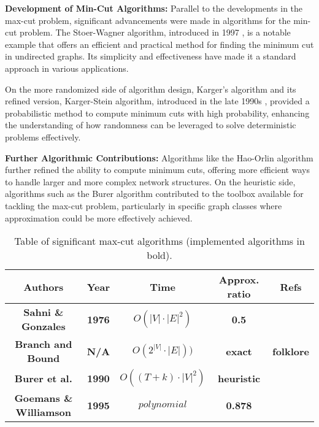 \textbf{Development of Min-Cut Algorithms:}
Parallel to the developments in the max-cut problem, significant advancements were made in algorithms for the min-cut problem. The Stoer-Wagner algorithm, introduced in 1997 \cite{stoer1997simple}, is a notable example that offers an efficient and practical method for finding the minimum cut in undirected graphs. Its simplicity and effectiveness have made it a standard approach in various applications.

On the more randomized side of algorithm design, Karger's algorithm and its refined version, Karger-Stein algorithm, introduced in the late 1990s \cite{karger1996new}, provided a probabilistic method to compute minimum cuts with high probability, enhancing the understanding of how randomness can be leveraged to solve deterministic problems effectively.

\textbf{Further Algorithmic Contributions:}
Algorithms like the Hao-Orlin algorithm \cite{hao1994faster} further refined the ability to compute minimum cuts, offering more efficient ways to handle larger and more complex network structures. On the heuristic side, algorithms such as the Burer algorithm \cite{burer2002rank} contributed to the toolbox available for tackling the max-cut problem, particularly in specific graph classes where approximation could be more effectively achieved.



\vspace{40pt}

\begin{table}[ht]
    \centering
    \begin{tabular}{c|c|c|c|c}
        \textbf{Authors} & \textbf{Year} & \textbf{Time} & \textbf{Approx. ratio} & \textbf{Refs} \\ \hline
        \textbf{Sahni \& Gonzales} & \textbf{1976} & $O(|V| \cdot |E|^2)$ & \textbf{0.5} & \cite{sahni1976p} \\
        \textbf{Branch and Bound} & \textbf{N/A} & $O(2^{|V|} \cdot |E|))$ & \textbf{exact} & \textbf{folklore} \\
        \textbf{Burer et al.} & \textbf{1990} & $O((T + k) \cdot |V|^2)$ & \textbf{heuristic} & \cite{burer2002rank} \\
        \textbf{Goemans \& Williamson} & \textbf{1995} & $polynomial$ & \textbf{\textbf{0.878}} & \cite{goemans1995improved} \\
    \end{tabular}
    \caption{Table of significant max-cut algorithms (implemented algorithms in bold).}
\end{table}

